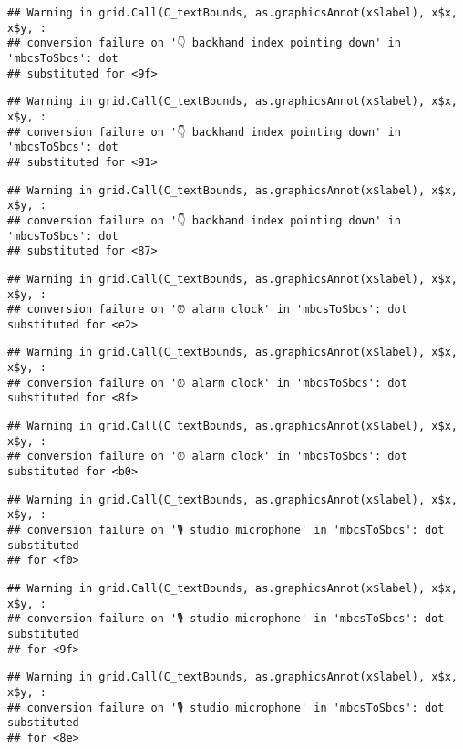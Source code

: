 \documentclass[
]{article}
\begin{document}
\begin{verbatim}
## Warning in grid.Call(C_textBounds, as.graphicsAnnot(x$label), x$x, x$y, :
## conversion failure on '👇 backhand index pointing down' in 'mbcsToSbcs': dot
## substituted for <9f>
\end{verbatim}

\begin{verbatim}
## Warning in grid.Call(C_textBounds, as.graphicsAnnot(x$label), x$x, x$y, :
## conversion failure on '👇 backhand index pointing down' in 'mbcsToSbcs': dot
## substituted for <91>
\end{verbatim}

\begin{verbatim}
## Warning in grid.Call(C_textBounds, as.graphicsAnnot(x$label), x$x, x$y, :
## conversion failure on '👇 backhand index pointing down' in 'mbcsToSbcs': dot
## substituted for <87>
\end{verbatim}

\begin{verbatim}
## Warning in grid.Call(C_textBounds, as.graphicsAnnot(x$label), x$x, x$y, :
## conversion failure on '⏰ alarm clock' in 'mbcsToSbcs': dot substituted for <e2>
\end{verbatim}

\begin{verbatim}
## Warning in grid.Call(C_textBounds, as.graphicsAnnot(x$label), x$x, x$y, :
## conversion failure on '⏰ alarm clock' in 'mbcsToSbcs': dot substituted for <8f>
\end{verbatim}

\begin{verbatim}
## Warning in grid.Call(C_textBounds, as.graphicsAnnot(x$label), x$x, x$y, :
## conversion failure on '⏰ alarm clock' in 'mbcsToSbcs': dot substituted for <b0>
\end{verbatim}

\begin{verbatim}
## Warning in grid.Call(C_textBounds, as.graphicsAnnot(x$label), x$x, x$y, :
## conversion failure on '🎙 studio microphone' in 'mbcsToSbcs': dot substituted
## for <f0>
\end{verbatim}

\begin{verbatim}
## Warning in grid.Call(C_textBounds, as.graphicsAnnot(x$label), x$x, x$y, :
## conversion failure on '🎙 studio microphone' in 'mbcsToSbcs': dot substituted
## for <9f>
\end{verbatim}

\begin{verbatim}
## Warning in grid.Call(C_textBounds, as.graphicsAnnot(x$label), x$x, x$y, :
## conversion failure on '🎙 studio microphone' in 'mbcsToSbcs': dot substituted
## for <8e>
\end{verbatim}
\end{document}

